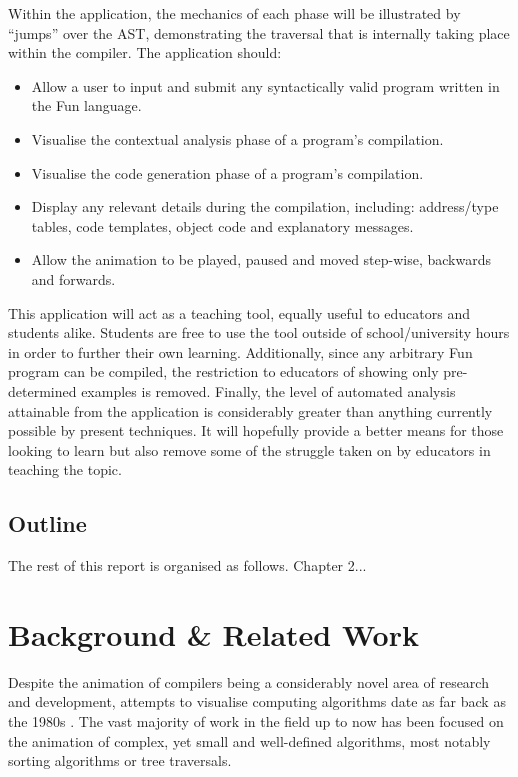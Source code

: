 \documentclass{l4proj}
\begin{document}
Within the application, the mechanics of each phase will be illustrated by ``jumps'' over the AST, demonstrating the traversal that is internally taking place within the compiler. The application should:
\begin{itemize}
\item Allow a user to input and submit any syntactically valid program written in the Fun language.
\item Visualise the contextual analysis phase of a program's compilation. 
\item Visualise the code generation phase of a program's compilation.
\item Display any relevant details during the compilation, including: address/type tables, code templates, object code and explanatory messages.
\item Allow the animation to be played, paused and moved step-wise, backwards and forwards.
\end{itemize}

This application will act as a teaching tool, equally useful to educators and students alike. Students are free to use the tool outside of school/university hours in order to further their own learning. Additionally, since any arbitrary Fun program can be compiled, the restriction to educators of showing only pre-determined examples is removed. Finally, the level of automated analysis attainable from the application is considerably greater than anything currently possible by present techniques. It will hopefully provide a better means for those looking to learn but also remove some of the struggle taken on by educators in teaching the topic.

\section{Outline}
The rest of this report is organised as follows. Chapter 2...

\chapter{Background \& Related Work}
Despite the animation of compilers being a considerably novel area of research and development, attempts to visualise computing algorithms date as far back as the 1980s \cite{BentleyKernighan}. The vast majority of work in the field up to now has been focused on the animation of complex, yet small and well-defined algorithms, most notably sorting algorithms or tree traversals.
\end{document}
